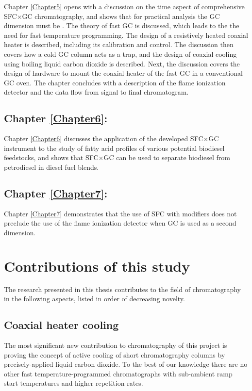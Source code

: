 Chapter \ref{Chapter5} opens with a discussion on the time aspect of
comprehensive SFC×GC chromatography, and shows that for practical analysis the
GC dimension must be . The theory of fast GC is discussed, which
leads to the the need for fast temperature programming. The design of a
resistively heated coaxial heater is described, including its calibration and
control. The discussion then covers how a cold GC column acts as a trap, and the
design of coaxial cooling using boiling liquid carbon dioxide is described.
Next, the discussion covers the design of hardware to mount the coaxial heater
of the fast GC in a conventional GC oven. The chapter concludes with a
description of the flame ionization detector and the data flow from signal to
final chromatogram.

\subsection{Chapter \ref{Chapter6}:  }

Chapter \ref{Chapter6} discusses the application of the developed SFC×GC
instrument to the study of fatty acid profiles of various potential biodiesel
feedstocks, and shows that SFC×GC can be used to separate biodiesel from
petrodiesel in diesel fuel blends.

\subsection{Chapter \ref{Chapter7}:  }

Chapter \ref{Chapter7} demonstrates that the use of SFC with modifiers does not
preclude the use of the flame ionization detector when GC is used as a second
dimension.

\section{Contributions of this study}

The research presented in this thesis contributes to the field of chromatography
in the following aspects, listed in order of decreasing novelty.

\subsection{Coaxial heater cooling}

The most significant new contribution to chromatography of this project is
proving the concept of active cooling of short chromatography columns by
precisely-applied liquid carbon dioxide. To the best of our knowledge there are
no other fast temperature-programmed chromatographs with sub-ambient ramp start
temperatures and higher repetition rates.

